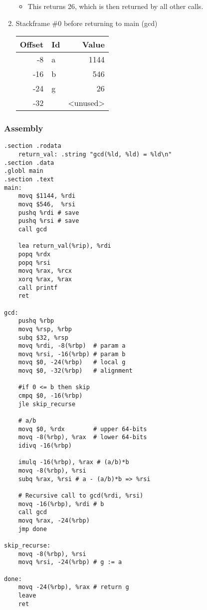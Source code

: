 \documentclass[11pt]{article}
\begin{document}
\begin{enumerate}
\begin{itemize}
\item This returns 26, which is then returned by all other calls.
\end{itemize}

\item Stackframe \#0 before returning to main (gcd)
\label{sec:orgfe0ea4b}
\begin{center}
\begin{tabular}{rlr}
Offset & Id & Value\\
\hline
-8 & a & 1144\\
-16 & b & 546\\
-24 & g & 26\\
-32 &  & <unused>\\
\end{tabular}
\end{center}
\end{enumerate}

\subsubsection{Assembly}
\label{sec:orgd08f72d}
\begin{verbatim}
.section .rodata
    return_val: .string "gcd(%ld, %ld) = %ld\n"
.section .data
.globl main
.section .text
main:
    movq $1144, %rdi
    movq $546,  %rsi
    pushq %rdi # save
    pushq %rsi # save
    call gcd

    lea return_val(%rip), %rdi
    popq %rdx
    popq %rsi
    movq %rax, %rcx
    xorq %rax, %rax
    call printf
    ret

gcd:
    pushq %rbp
    movq %rsp, %rbp
    subq $32, %rsp
    movq %rdi, -8(%rbp)  # param a
    movq %rsi, -16(%rbp) # param b
    movq $0, -24(%rbp)   # local g
    movq $0, -32(%rbp)   # alignment

    #if 0 <= b then skip
    cmpq $0, -16(%rbp)
    jle skip_recurse

    # a/b
    movq $0, %rdx        # upper 64-bits
    movq -8(%rbp), %rax  # lower 64-bits
    idivq -16(%rbp)

    imulq -16(%rbp), %rax # (a/b)*b
    movq -8(%rbp), %rsi
    subq %rax, %rsi # a - (a/b)*b => %rsi

    # Recursive call to gcd(%rdi, %rsi)
    movq -16(%rbp), %rdi # b
    call gcd
    movq %rax, -24(%rbp)
    jmp done

skip_recurse:
    movq -8(%rbp), %rsi
    movq %rsi, -24(%rbp) # g := a

done:
    movq -24(%rbp), %rax # return g
    leave
    ret
\end{verbatim}
\end{document}
